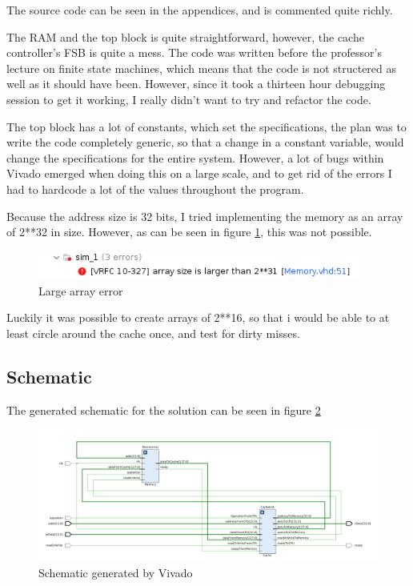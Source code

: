 \documentclass{article}
\begin{document}
The source code can be seen in the appendices, and is commented quite richly. 

The RAM and the top block is quite straightforward, however, the cache controller's FSB is quite a mess. The code was written before the professor's lecture on finite state machines, which means that the code is not structered as well as it should have been. However, since it took a thirteen hour debugging session to get it working, I really didn't want to try and refactor the code. 

The top block has a lot of constants, which set the specifications, the plan was to write the code completely generic, so that a change in a constant variable, would change the specifications for the entire system. However, a lot of bugs within Vivado emerged when doing this on a large scale, and to get rid of the errors I had to hardcode a lot of the values throughout the program. 

Because the address size is 32 bits, I tried implementing the memory as an array of 2**32 in size. However, as can be seen in figure \ref{ERROR}, this was not possible.
\begin{figure}[H]
 \centering
  \includegraphics[width=300pt]{img/arraySizeError.png}
 \caption{Large array error}
  \label{ERROR}
 \end{figure}

Luckily it was possible to create arrays of 2**16, so that i would be able to at least circle around the cache once, and test for dirty misses. 


\subsection{Schematic}
The generated schematic for the solution can be seen in figure \ref{SCHEMATIC}

\begin{figure}[H]
 \centering
  \includegraphics[width=400pt]{img/schematic211020.png}
 \caption{Schematic generated by Vivado}
  \label{SCHEMATIC}
 \end{figure}
\end{document}
